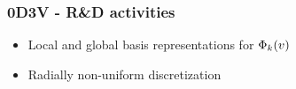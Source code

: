 \documentclass[mathserif, aspectratio=169]{beamer}
\newcommand{\of}[1]{\mleft( #1 \mright)}
\begin{document}
\begin{frame}
	\frametitle{0D3V - R\&D activities}
	\begin{itemize}
		\item Local and global basis representations for $\Phi_k\of{v}$
		
		\item Radially non-uniform discretization



\end{itemize}
\end{frame}
\end{document}
